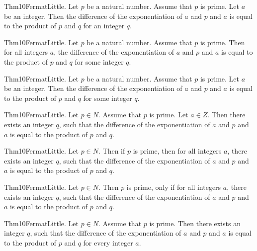 \documentclass{article}
\begin{document}
Thm10FermatLittle. Let $p$ be a natural number. Assume that $p$ is prime. Let $a$ be an integer. Then the difference of the exponentiation of $a$ and $p$ and $a$ is equal to the product of $p$ and $q$ for an integer $q$.

Thm10FermatLittle. Let $p$ be a natural number. Assume that $p$ is prime. Then for all integers $a$, the difference of the exponentiation of $a$ and $p$ and $a$ is equal to the product of $p$ and $q$ for some integer $q$.

Thm10FermatLittle. Let $p$ be a natural number. Assume that $p$ is prime. Let $a$ be an integer. Then the difference of the exponentiation of $a$ and $p$ and $a$ is equal to the product of $p$ and $q$ for some integer $q$.

Thm10FermatLittle. Let $p \in N$. Assume that $p$ is prime. Let $a \in Z$. Then there exists an integer $q$, such that the difference of the exponentiation of $a$ and $p$ and $a$ is equal to the product of $p$ and $q$.

Thm10FermatLittle. Let $p \in N$. Then if $p$ is prime, then for all integers $a$, there exists an integer $q$, such that the difference of the exponentiation of $a$ and $p$ and $a$ is equal to the product of $p$ and $q$.

Thm10FermatLittle. Let $p \in N$. Then $p$ is prime, only if for all integers $a$, there exists an integer $q$, such that the difference of the exponentiation of $a$ and $p$ and $a$ is equal to the product of $p$ and $q$.

Thm10FermatLittle. Let $p \in N$. Assume that $p$ is prime. Then there exists an integer $q$, such that the difference of the exponentiation of $a$ and $p$ and $a$ is equal to the product of $p$ and $q$ for every integer $a$.
\end{document}

